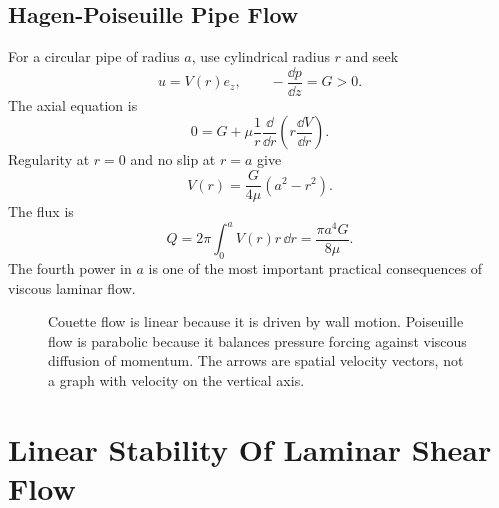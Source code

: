 \subsection{Hagen-Poiseuille Pipe Flow}
\label{subsec:hagen-poiseuille}

For a circular pipe of radius \(a\), use cylindrical radius \(r\) and seek
\[
  u=V(r)e_z,\qquad -\frac{\dd p}{\dd z}=G>0.
\]
The axial equation is
\[
  0=G+\mu\frac1r\frac{\dd}{\dd r}
  \left(
    r\frac{\dd V}{\dd r}
  \right).
\]
Regularity at \(r=0\) and no slip at \(r=a\) give
\[
  \boxed{
  V(r)=\frac{G}{4\mu}(a^2-r^2).
  }
\]
The flux is
\[
  Q=2\pi\int_0^a V(r)r\,\dd r
  =
  \boxed{\frac{\pi a^4G}{8\mu}}.
\]
The fourth power in \(a\) is one of the most important practical consequences
of viscous laminar flow.

\begin{figure}[htbp]
\centering
{}
\caption{Couette flow is linear because it is driven by wall motion. Poiseuille
flow is parabolic because it balances pressure forcing against viscous
diffusion of momentum. The arrows are spatial velocity vectors, not a graph
with velocity on the vertical axis.}
\label{fig:couette-poiseuille-profiles}
\end{figure}

\section{Linear Stability Of Laminar Shear Flow}
\label{sec:linear-stability-shear}

